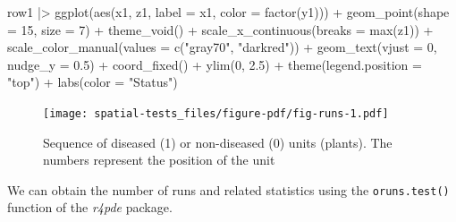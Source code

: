 \documentclass[
  letterpaper,
]{book}
\newenvironment{Shaded}{\begin{snugshade}}{\end{snugshade}}
\newcommand{\AttributeTok}[1]{\textcolor[rgb]{0.40,0.45,0.13}{#1}}
\newcommand{\DecValTok}[1]{\textcolor[rgb]{0.68,0.00,0.00}{#1}}
\newcommand{\FloatTok}[1]{\textcolor[rgb]{0.68,0.00,0.00}{#1}}
\newcommand{\FunctionTok}[1]{\textcolor[rgb]{0.28,0.35,0.67}{#1}}
\newcommand{\NormalTok}[1]{\textcolor[rgb]{0.00,0.23,0.31}{#1}}
\newcommand{\SpecialCharTok}[1]{\textcolor[rgb]{0.37,0.37,0.37}{#1}}
\newcommand{\StringTok}[1]{\textcolor[rgb]{0.13,0.47,0.30}{#1}}
\begin{document}
\begin{Shaded}
\begin{Highlighting}[]
\NormalTok{row1 }\SpecialCharTok{|\textgreater{}}
  \FunctionTok{ggplot}\NormalTok{(}\FunctionTok{aes}\NormalTok{(x1, z1, }\AttributeTok{label =}\NormalTok{ x1, }\AttributeTok{color =} \FunctionTok{factor}\NormalTok{(y1))) }\SpecialCharTok{+}
  \FunctionTok{geom\_point}\NormalTok{(}\AttributeTok{shape =} \DecValTok{15}\NormalTok{, }\AttributeTok{size =} \DecValTok{7}\NormalTok{) }\SpecialCharTok{+}
  \FunctionTok{theme\_void}\NormalTok{() }\SpecialCharTok{+}
  \FunctionTok{scale\_x\_continuous}\NormalTok{(}\AttributeTok{breaks =} \FunctionTok{max}\NormalTok{(z1)) }\SpecialCharTok{+}
  \FunctionTok{scale\_color\_manual}\NormalTok{(}\AttributeTok{values =} \FunctionTok{c}\NormalTok{(}\StringTok{"gray70"}\NormalTok{, }\StringTok{"darkred"}\NormalTok{)) }\SpecialCharTok{+}
  \FunctionTok{geom\_text}\NormalTok{(}\AttributeTok{vjust =} \DecValTok{0}\NormalTok{, }\AttributeTok{nudge\_y =} \FloatTok{0.5}\NormalTok{) }\SpecialCharTok{+}
  \FunctionTok{coord\_fixed}\NormalTok{() }\SpecialCharTok{+}
  \FunctionTok{ylim}\NormalTok{(}\DecValTok{0}\NormalTok{, }\FloatTok{2.5}\NormalTok{) }\SpecialCharTok{+}
  \FunctionTok{theme}\NormalTok{(}\AttributeTok{legend.position =} \StringTok{"top"}\NormalTok{) }\SpecialCharTok{+}
  \FunctionTok{labs}\NormalTok{(}\AttributeTok{color =} \StringTok{"Status"}\NormalTok{)}
\end{Highlighting}
\end{Shaded}

\begin{figure}[H]

\texttt{[image: spatial-tests\_files/figure-pdf/fig-runs-1.pdf]} \hfill{}

\caption{\label{fig-runs}Sequence of diseased (1) or non-diseased (0)
units (plants). The numbers represent the position of the unit}

\end{figure}

We can obtain the number of runs and related statistics using the
\texttt{oruns.test()} function of the \emph{r4pde} package.

\begin{Shaded}
\end{Shaded}
\end{document}
